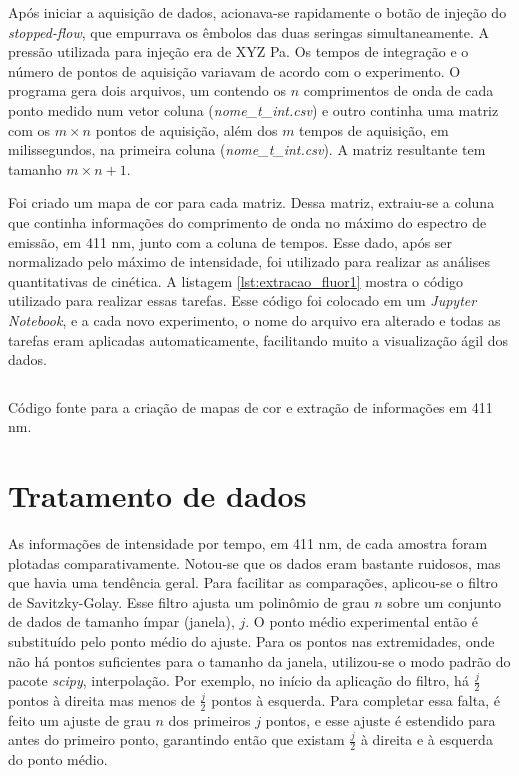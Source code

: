 			Após iniciar a aquisição de dados, acionava-se rapidamente o botão de injeção do \emph{stopped-flow}, que empurrava os êmbolos das duas seringas simultaneamente. A pressão utilizada para injeção era de XYZ Pa. Os tempos de integração e o número de pontos de aquisição variavam de acordo com o experimento. O programa gera dois arquivos, um contendo os \(n\) comprimentos de onda de cada ponto medido num vetor coluna (\emph{nome\_t\_int.csv}) e outro continha uma matriz com os \(m \times n\) pontos de aquisição, além dos \(m\) tempos de aquisição, em milissegundos, na primeira coluna (\emph{nome\_t\_int.csv}). A matriz resultante tem tamanho \(m\times n+1\).
			
			Foi criado um mapa de cor para cada matriz. Dessa matriz, extraiu-se a coluna que continha informações do comprimento de onda no máximo do espectro de emissão, em 411 nm, junto com a coluna de tempos. Esse dado, após ser normalizado pelo máximo de intensidade, foi utilizado para realizar as análises quantitativas de cinética. A listagem \ref{lst:extracao_fluor1} mostra o código utilizado para realizar essas tarefas. Esse código foi colocado em um \emph{Jupyter Notebook}, e a cada novo experimento, o nome do arquivo era alterado e todas as tarefas eram aplicadas automaticamente, facilitando muito a visualização ágil dos dados.
			
			\begin{listing}[H]
				\inputminted{python}{./python/fluor_plot_inicial.py}
				\caption{Código fonte para a criação de mapas de cor e extração de informações em 411 nm.}
				\label{lst:extracao_fluor1}
			\end{listing}
			
		\section{Tratamento de dados}
		
			As informações de intensidade por tempo, em 411 nm, de cada amostra foram plotadas comparativamente. Notou-se que os dados eram bastante ruidosos, mas que havia uma tendência geral. Para facilitar as comparações, aplicou-se o filtro de Savitzky-Golay. Esse filtro ajusta um polinômio de grau \(n\) sobre um conjunto de dados de tamanho ímpar (janela), \(j\). O ponto médio experimental então é substituído pelo ponto médio do ajuste. Para os pontos nas extremidades, onde não há pontos suficientes para o tamanho da janela, utilizou-se o modo padrão do pacote \emph{scipy}, interpolação. Por exemplo, no início da aplicação do filtro, há \(\frac{j}{2}\) pontos à direita mas menos de \(\frac{j}{2}\) pontos à esquerda. Para completar essa falta, é feito um ajuste de grau \(n\) dos primeiros \(j\) pontos, e esse ajuste é estendido para antes do primeiro ponto, garantindo então que existam \(\frac{j}{2}\) à direita e à esquerda do ponto médio.
			
